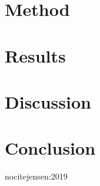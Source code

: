 \documentclass[twocolumn]{aastex62}
\begin{document}
\section{Method} \label{sec:method}

\section{Results} \label{sec:results}
\section{Discussion} \label{sec:discussion}
\section{Conclusion} \label{sec:conclusion}

nocite{jensen:2019}


\end{document}
